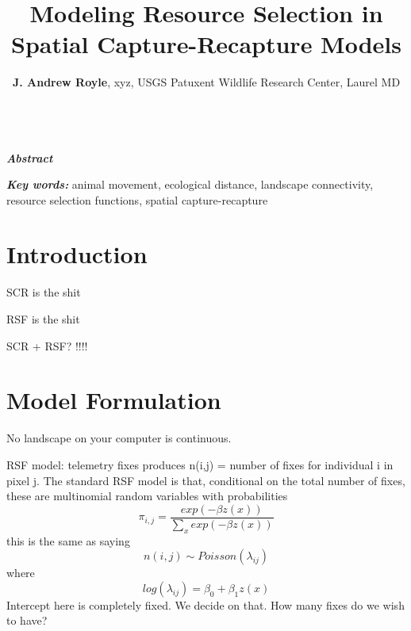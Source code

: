 \documentclass[12pt]{article}
\title{Modeling Resource Selection in 
 Spatial Capture-Recapture Models}
\author{
{\bf J. Andrew Royle}, xyz, 
USGS Patuxent Wildlife Research Center, Laurel MD \\ \\
}
\begin{document}
\maketitle

\date


\linenumbers


\begin{spacing}{1.8}

\begin{flushleft}
{\em \bf Abstract}


{\em \bf Key words:} animal movement, ecological distance, 
landscape connectivity,
resource selection functions, 
 spatial capture-recapture

\end{flushleft}



\section{Introduction}

SCR is the shit

RSF is the shit

SCR + RSF? !!!!





\section{Model Formulation}

No landscape on your computer is continuous.

RSF model:
 telemetry fixes produces n(i,j) = number of fixes for individual i in
 pixel j.  The standard RSF model is that, conditional on the total
 number of fixes, these are multinomial random variables with
 probabilities
\[
 \pi_{i,j} = \frac{ exp( -\beta z(x) ) }{ \sum_{x} exp(-\beta z(x))} 
\]
this is the same as saying
\[
 n(i,j) \sim Poisson( \lambda_{ij})
\]
where
\[
 log(\lambda_{ij}) = \beta_{0}  + \beta_{1} z(x)
\]
Intercept here is completely fixed. We decide on that. How many fixes
do we wish to have?




\end{spacing}
\end{document}
